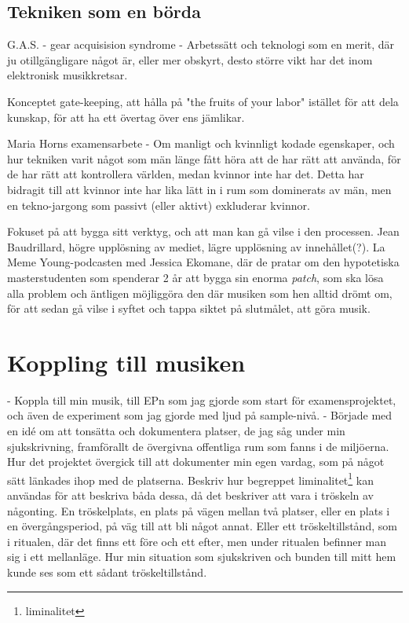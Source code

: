\documentclass{article}
\begin{document}
\subsection{Tekniken som en börda}
G.A.S. - gear acquisision syndrome
- Arbetssätt och teknologi som en merit, där ju otillgängligare något är, eller mer obskyrt, desto större vikt
  har det inom elektronisk musikkretsar. 

  Konceptet gate-keeping, att hålla på "the fruits of your labor" istället för att dela kunskap, för att ha
  ett övertag över ens jämlikar.

  Maria Horns examensarbete - Om manligt och kvinnligt kodade egenskaper, och hur tekniken varit något som män
  länge fått höra att de har rätt att använda, för de har rätt att kontrollera världen, medan kvinnor inte har
  det. Detta har bidragit till att kvinnor inte har lika lätt in i rum som dominerats av män, men en
  tekno-jargong som passivt (eller aktivt) exkluderar kvinnor. 

  Fokuset på att bygga sitt verktyg, och att man kan gå vilse i den processen. Jean Baudrillard, högre
  upplösning av mediet, lägre upplösning av innehållet(?). 
  La Meme Young-podcasten med Jessica Ekomane, där de pratar om den hypotetiska masterstudenten som spenderar
  2 år att bygga sin enorma \emph{patch}, som ska lösa alla problem och äntligen möjliggöra den där musiken
  som hen alltid drömt om, för att sedan gå vilse i syftet och tappa siktet på slutmålet, att göra musik. 




\section{Koppling till musiken}
- Koppla till min musik, till EPn som jag gjorde som start för examensprojektet, och även de experiment som
  jag gjorde med ljud på sample-nivå. 
- Började med en idé om att tonsätta och dokumentera platser, de jag såg under min sjukskrivning, framförallt
  de övergivna offentliga rum som fanns i de miljöerna. Hur det projektet övergick till att dokumenter min
  egen vardag, som på något sätt länkades ihop med de platserna. Beskriv hur begreppet
  liminalitet\footnote{liminalitet} kan användas för att beskriva båda dessa, då det beskriver att vara i
  tröskeln av någonting. En tröskelplats, en plats på vägen mellan två platser, eller en plats i en
  övergångsperiod, på väg till att bli något annat. Eller ett tröskeltillstånd, som i ritualen, där det finns
  ett före och ett efter, men under ritualen befinner man sig i ett mellanläge. Hur min situation som
  sjukskriven och bunden till mitt hem kunde ses som ett sådant tröskeltillstånd.
\end{document}
